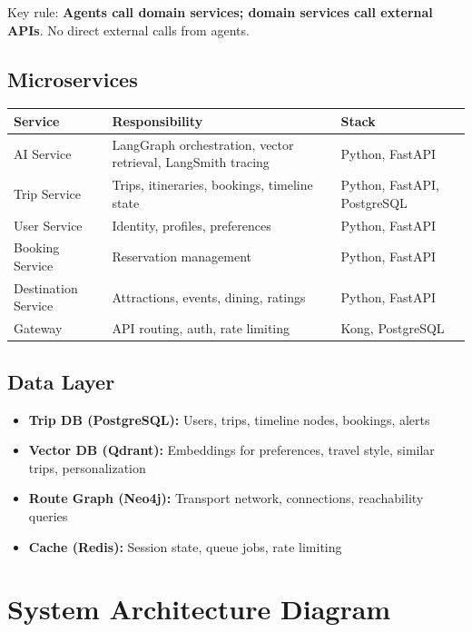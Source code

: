\documentclass[11pt]{article}
\begin{document}
Key rule: \textbf{Agents call domain services; domain services call external APIs}. No direct external calls from agents.

\subsection{Microservices}

\begin{table}[H]\centering\small
\begin{tabular}{|l|p{2.8in}|p{1.2in}|}
\hline
\textbf{Service} & \textbf{Responsibility} & \textbf{Stack} \\
\hline
AI Service & LangGraph orchestration, vector retrieval, LangSmith tracing & Python, FastAPI \\
\hline
Trip Service & Trips, itineraries, bookings, timeline state & Python, FastAPI, PostgreSQL \\
\hline
User Service & Identity, profiles, preferences & Python, FastAPI \\
\hline
Booking Service & Reservation management & Python, FastAPI \\
\hline
Destination Service & Attractions, events, dining, ratings & Python, FastAPI \\
\hline
Gateway & API routing, auth, rate limiting & Kong, PostgreSQL \\
\hline
\end{tabular}
\end{table}

\subsection{Data Layer}

\begin{itemize}
    \item \textbf{Trip DB (PostgreSQL):} Users, trips, timeline nodes, bookings, alerts
    \item \textbf{Vector DB (Qdrant):} Embeddings for preferences, travel style, similar trips, personalization
    \item \textbf{Route Graph (Neo4j):} Transport network, connections, reachability queries
    \item \textbf{Cache (Redis):} Session state, queue jobs, rate limiting
\end{itemize}

\section{System Architecture Diagram}
\end{document}
